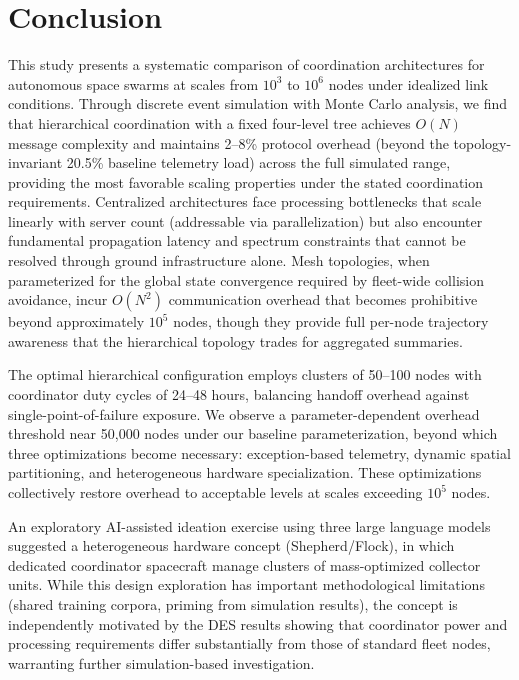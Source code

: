 \documentclass[journal]{IEEEtran}
\begin{document}
\section{Conclusion}

This study presents a systematic comparison of coordination architectures for autonomous space swarms at scales from $10^3$ to $10^6$ nodes under idealized link conditions. Through discrete event simulation with Monte Carlo analysis, we find that hierarchical coordination with a fixed four-level tree achieves $O(N)$ message complexity and maintains 2--8\% protocol overhead (beyond the topology-invariant 20.5\% baseline telemetry load) across the full simulated range, providing the most favorable scaling properties under the stated coordination requirements. Centralized architectures face processing bottlenecks that scale linearly with server count (addressable via parallelization) but also encounter fundamental propagation latency and spectrum constraints that cannot be resolved through ground infrastructure alone. Mesh topologies, when parameterized for the global state convergence required by fleet-wide collision avoidance, incur $O(N^2)$ communication overhead that becomes prohibitive beyond approximately $10^5$ nodes, though they provide full per-node trajectory awareness that the hierarchical topology trades for aggregated summaries.

The optimal hierarchical configuration employs clusters of 50--100 nodes with coordinator duty cycles of 24--48 hours, balancing handoff overhead against single-point-of-failure exposure. We observe a parameter-dependent overhead threshold near 50{,}000 nodes under our baseline parameterization, beyond which three optimizations become necessary: exception-based telemetry, dynamic spatial partitioning, and heterogeneous hardware specialization. These optimizations collectively restore overhead to acceptable levels at scales exceeding $10^5$ nodes.

An exploratory AI-assisted ideation exercise using three large language models suggested a heterogeneous hardware concept (Shepherd/Flock), in which dedicated coordinator spacecraft manage clusters of mass-optimized collector units. While this design exploration has important methodological limitations (shared training corpora, priming from simulation results), the concept is independently motivated by the DES results showing that coordinator power and processing requirements differ substantially from those of standard fleet nodes, warranting further simulation-based investigation.
\end{document}
